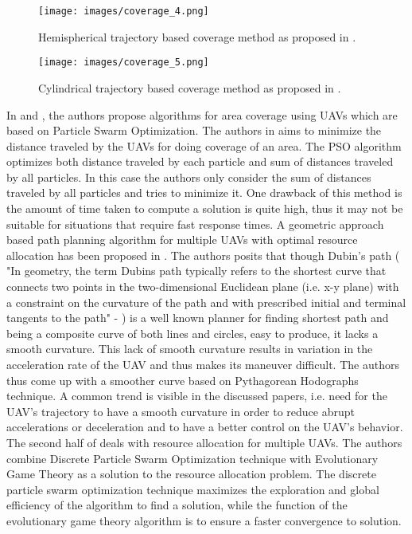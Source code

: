 \begin{figure}[htbp] %
 \centering
   \texttt{[image: images/coverage\_4.png]}
   \caption[Hemispherical trajectory based coverage method \cite{6}]
   {Hemispherical trajectory based coverage method as proposed in \cite{6}.}
   \label{fig:hchc}
\end{figure}

\begin{figure}[htbp] %
 \centering
   \texttt{[image: images/coverage\_5.png]}
   \caption[Cylindrical trajectory based coverage method \cite{6}]
   {Cylindrical trajectory based coverage method as proposed in \cite{6}.}
   \label{fig:cchc}
\end{figure}

In \cite{7} and \cite{8}, the authors propose algorithms for area coverage using UAVs which are based on Particle Swarm Optimization. The authors in \cite{7} aims to minimize the distance traveled by the UAVs for doing coverage of an area. The PSO algorithm optimizes both distance traveled by each particle and sum of distances traveled by all particles. In this case the authors only consider the sum of distances traveled by all particles and tries to minimize it. One drawback of this method is the amount of time taken to compute a solution is quite high, thus it may not be suitable for situations that require fast response times.
A geometric approach based path planning algorithm for multiple UAVs with optimal resource allocation has been proposed in \cite{8} . The authors posits that though Dubin's path ( "In geometry, the term Dubins path typically refers to the shortest curve that connects two points in the two-dimensional Euclidean plane (i.e. x-y plane) with a constraint on the curvature of the path and with prescribed initial and terminal tangents to the path" - \cite{21}) is a well known planner for finding shortest path and being a composite curve of both lines and circles, easy to produce, it lacks a smooth curvature. This lack of smooth curvature results in variation in the acceleration rate of the UAV and thus makes its maneuver difficult. The authors thus come up with a smoother curve based on Pythagorean Hodographs technique. A common trend is visible in the discussed papers, i.e. need for the UAV's trajectory to have a smooth curvature in order to reduce abrupt accelerations or deceleration and to have a better control on the UAV's behavior. The second half of \cite{8} deals with resource allocation for multiple UAVs. The authors combine Discrete Particle Swarm Optimization technique with Evolutionary Game Theory as a solution to the resource allocation problem. The discrete particle swarm optimization technique maximizes the exploration and global efficiency of the algorithm to find a solution, while the function of the evolutionary game theory algorithm is to ensure a faster convergence to solution.

